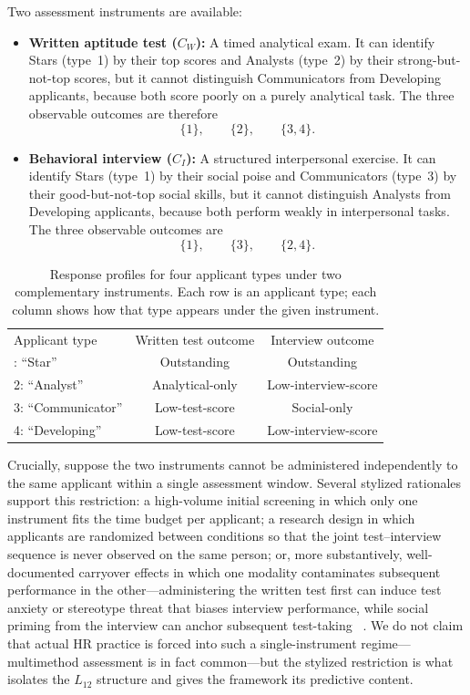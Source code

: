 \documentclass[aps,pra,twocolumn,superscriptaddress,floatfix,longbibliography]{revtex4-2}
\begin{document}
Two assessment instruments are available:
\begin{itemize}
\item \textbf{Written aptitude test ($C_W$):} A timed analytical
exam. It can identify Stars (type~1) by their top scores and
Analysts (type~2) by their strong-but-not-top scores, but it cannot
distinguish Communicators from Developing applicants, because both
score poorly on a purely analytical task. The three observable
outcomes are therefore
\[
\{1\},\qquad \{2\},\qquad \{3,4\}.
\]
\item \textbf{Behavioral interview ($C_I$):} A structured
interpersonal exercise. It can identify Stars (type~1) by their
social poise and Communicators (type~3) by their good-but-not-top
social skills, but it cannot distinguish Analysts from Developing
applicants, because both perform weakly in interpersonal tasks. The
three observable outcomes are
\[
\{1\},\qquad \{3\},\qquad \{2,4\}.
\]
\end{itemize}

\begin{table}[b]
\caption{\label{tab:personnel}Response profiles for four applicant
types under two complementary instruments. Each row is an applicant
type; each column shows how that type appears under the given
instrument.}
\begin{ruledtabular}
\begin{tabular}{lcc}
Applicant type & Written test outcome & Interview outcome \\
\colrule
1: ``Star'' & Outstanding & Outstanding \\
2: ``Analyst'' & Analytical-only & Low-interview-score \\
3: ``Communicator'' & Low-test-score & Social-only \\
4: ``Developing'' & Low-test-score & Low-interview-score \\
\end{tabular}
\end{ruledtabular}
\end{table}

Crucially, suppose the two instruments cannot be administered
independently to the same applicant within a single assessment
window. Several stylized rationales support this restriction: a
high-volume initial screening in which only one instrument fits the
time budget per applicant; a research design in which applicants are
randomized between conditions so that the joint test--interview
sequence is never observed on the same person; or, more
substantively, well-documented carryover effects in which one
modality contaminates subsequent performance in the
other---administering the written test first can induce test anxiety
or stereotype threat that biases interview performance, while social
priming from the interview can anchor subsequent test-taking
~\cite{Tversky1974}. We do not claim that actual HR practice is
forced into such a single-instrument regime---multimethod assessment
is in fact common---but the stylized restriction is what isolates the
$L_{12}$ structure and gives the framework its predictive content.
\end{document}
